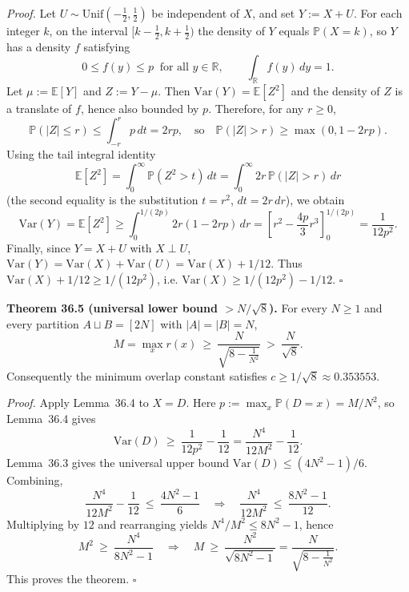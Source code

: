 \noindent\emph{Proof.}
Let \(U\sim\mathrm{Unif}(-\tfrac12,\tfrac12)\) be independent of \(X\), and set \(Y:=X+U\).
For each integer \(k\), on the interval \([k-\tfrac12,k+\tfrac12)\) the density of \(Y\) equals \(\mathbb P(X=k)\), so \(Y\) has a density \(f\) satisfying
\[
0\le f(y)\le p\ \text{ for all }y\in\mathbb R,\qquad \int_{\mathbb R} f(y)\,dy=1.
\]
Let \(\mu:=\mathbb E[Y]\) and \(Z:=Y-\mu\). Then \(\mathrm{Var}(Y)=\mathbb E[Z^2]\) and the density of \(Z\) is a translate of \(f\), hence also bounded by \(p\).
Therefore, for any \(r\ge 0\),
\[
\mathbb P(|Z|\le r)\le \int_{-r}^{r} p\,dt=2rp,
\quad\text{so}\quad
\mathbb P(|Z|>r)\ge \max(0,1-2rp).
\]
Using the tail integral identity
\[
\mathbb E[Z^2]=\int_0^{\infty} \mathbb P(Z^2>t)\,dt
=\int_0^{\infty} 2r\,\mathbb P(|Z|>r)\,dr
\]
(the second equality is the substitution \(t=r^2\), \(dt=2r\,dr\)), we obtain
\[
\mathrm{Var}(Y)=\mathbb E[Z^2]
\ge \int_0^{1/(2p)} 2r(1-2rp)\,dr
=\left[r^2-\frac{4p}{3}r^3\right]_{0}^{1/(2p)}
=\frac{1}{12p^2}.
\]
Finally, since \(Y=X+U\) with \(X\perp U\),
\(
\mathrm{Var}(Y)=\mathrm{Var}(X)+\mathrm{Var}(U)=\mathrm{Var}(X)+1/12
\).
Thus
\(
\mathrm{Var}(X)+1/12\ge 1/(12p^2)
\), i.e.
\(
\mathrm{Var}(X)\ge 1/(12p^2)-1/12
\).
\hfill$\square$

\medskip
\noindent\textbf{Theorem 36.5 (universal lower bound \(>N/\sqrt8\)).}
For every \(N\ge 1\) and every partition \(A\sqcup B=[2N]\) with \(|A|=|B|=N\),
\[
M=\max_x r(x)\ \ge\ \frac{N}{\sqrt{8-\frac{1}{N^2}}}\ >\ \frac{N}{\sqrt 8}.
\]
Consequently the minimum overlap constant satisfies \(c\ge 1/\sqrt 8\approx 0.353553\).

\noindent\emph{Proof.}
Apply Lemma~36.4 to \(X=D\). Here
\(p:=\max_x\mathbb P(D=x)=M/N^2\), so Lemma~36.4 gives
\[
\mathrm{Var}(D)\ \ge\ \frac{1}{12p^2}-\frac{1}{12}
=\frac{N^4}{12M^2}-\frac{1}{12}.
\]
Lemma~36.3 gives the universal upper bound
\(\mathrm{Var}(D)\le (4N^2-1)/6\).
Combining,
\[
\frac{N^4}{12M^2}-\frac{1}{12}\ \le\ \frac{4N^2-1}{6}
\quad\Rightarrow\quad
\frac{N^4}{12M^2}\ \le\ \frac{8N^2-1}{12}.
\]
Multiplying by \(12\) and rearranging yields
\(
N^4/M^2\le 8N^2-1
\), hence
\[
M^2\ \ge\ \frac{N^4}{8N^2-1}
\quad\Rightarrow\quad
M\ \ge\ \frac{N^2}{\sqrt{8N^2-1}}=\frac{N}{\sqrt{8-\frac{1}{N^2}}}.
\]
This proves the theorem.
\hfill$\square$


